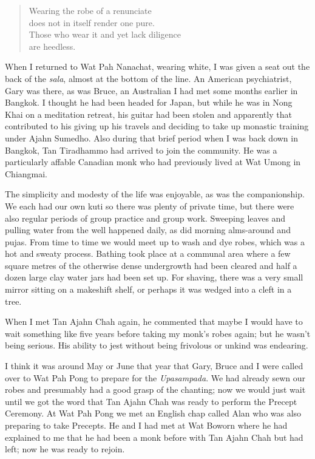 \begin{quote}
  Wearing the robe of a renunciate\\
  does not in itself render one pure.\\
  Those who wear it and yet lack diligence\\
  are heedless.
\end{quote}

When I returned to Wat Pah Nanachat, wearing white, I was given a seat
out the back of the \emph{sala}, almost at the bottom of the line. An
American psychiatrist, Gary was there, as was Bruce, an Australian I had
met some months earlier in Bangkok. I thought he had been headed for
Japan, but while he was in Nong Khai on a meditation retreat, his guitar
had been stolen and apparently that contributed to his giving up his
travels and deciding to take up monastic training under Ajahn Sumedho.
Also during that brief period when I was back down in Bangkok, Tan
Tiradhammo had arrived to join the community. He was a particularly
affable Canadian monk who had previously lived at Wat Umong in
Chiangmai.

The simplicity and modesty of the life was enjoyable, as was the
companionship. We each had our own kuti so there was plenty of private
time, but there were also regular periods of group practice and group
work. Sweeping leaves and pulling water from the well happened daily, as
did morning alms-around and pujas. From time to time we would meet up to
wash and dye robes, which was a hot and sweaty process. Bathing took
place at a communal area where a few square metres of the otherwise
dense undergrowth had been cleared and half a dozen large clay water
jars had been set up. For shaving, there was a very small mirror sitting
on a makeshift shelf, or perhaps it was wedged into a cleft in a tree.

When I met Tan Ajahn Chah again, he commented that maybe I would have to
wait something like five years before taking my monk's robes again; but
he wasn't being serious. His ability to jest without being frivolous or
unkind was endearing.

I think it was around May or June that year that Gary, Bruce and I were
called over to Wat Pah Pong to prepare for the \emph{Upasampada}. We had
already sewn our robes and presumably had a good grasp of the chanting;
now we would just wait until we got the word that Tan Ajahn Chah was
ready to perform the Precept Ceremony. At Wat Pah Pong we met an English
chap called Alan who was also preparing to take Precepts. He and I had
met at Wat Boworn where he had explained to me that he had been a monk
before with Tan Ajahn Chah but had left; now he was ready to rejoin.

